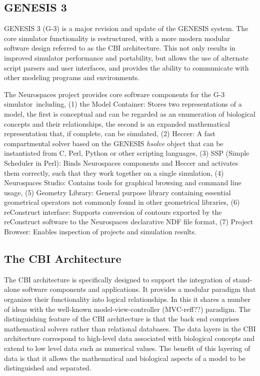 \documentclass[10pt]{article}
\begin{document}
\subsection*{GENESIS 3}

GENESIS 3 (G-3) is a major revision and update of the GENESIS system.  The core
simulator functionality is restructured, with a more modern modular software
design referred to as the CBI architecture. This not
only results in improved simulator performance and portability, but
allows the use of alternate script parsers and user interfaces,
and provides the ability to communicate with other modeling programs and
environments.

The Neurospaces project provides core software components for the G-3
simulator\,\cite{cornelis03:_neuros} including, (1) the
Model Container: Stores two representations of a model, the
first is conceptual and can be regarded as an enumeration of
biological concepts and their relationships, the second is an expanded
mathematical representation that, if complete, can be simulated, (2)
Heccer: A fast compartmental solver based on the GENESIS {\it
  hsolve} object that can be instantiated from C, Perl, Python or
other scripting languages, (3) SSP (Simple Scheduler in Perl): Binds Neurospaces components and Heccer and activates them correctly,
such that they work together on a single simulation, (4) Neurospaces Studio: Contains tools for graphical browsing and
command line usage, (5) Geometry Library: General purpose
library containing essential geometrical operators not commonly found
in other geometrical libraries, (6) reConstruct interface:
Supports conversion of contours exported by the reConstruct software
to the Neurospaces declarative NDF file format, (7) Project Browser:
Enables inspection of projects and simulation results.

\subsection*{The CBI Architecture}

The CBI architecture is specifically designed
to support the integration of stand-alone software components
and applications.
It provides a modular paradigm that organizes their functionality into logical relationships. In this it shares a number of
ideas with the well-known model-view-controller (MVC-reff??) paradigm.
The distinguishing feature of the CBI architecture is that the back
end comprises mathematical solvers rather than relational databases.
The data layers in the CBI architecture correspond to high-level data
associated with biological concepts and extend to low level data such
as numerical values. The benefit of this layering of data is that it
allows the mathematical and biological aspects of a model to be
distinguished and separated.
\end{document}
